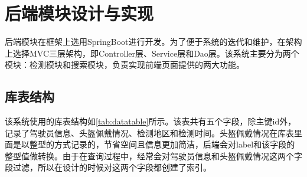 

\section{后端模块设计与实现}
后端模块在框架上选用SpringBoot进行开发。为了便于系统的迭代和维护，在架构上选择MVC三层架构，即Controller层、Service层和Dao层。该系统主要分为两个模块：检测模块和搜索模块，负责实现前端页面提供的两大功能。

\subsection{库表结构}
该系统使用的库表结构如\ref{tab:datatable}所示。该表共有五个字段，除主键id外，记录了驾驶员信息、头盔佩戴情况、检测地区和检测时间。头盔佩戴情况在库表里面是以整型的方式记录的，节省空间且信息更加简洁，后端会对label和该字段的整型值做转换。由于在查询过程中，经常会对驾驶员信息和头盔佩戴情况这两个字段过滤，所以在设计的时候对这两个字段都创建了索引。

